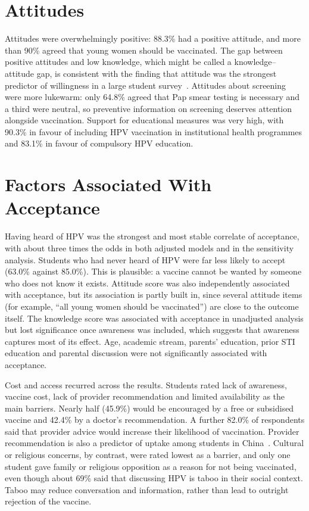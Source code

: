 \section{Attitudes}
Attitudes were overwhelmingly positive: 88.3\% had a positive attitude, and more than 90\% agreed that young women should be vaccinated. The gap between positive attitudes and low knowledge, which might be called a knowledge--attitude gap, is consistent with the finding that attitude was the strongest predictor of willingness in a large student survey~\cite{emon2025}. Attitudes about screening were more lukewarm: only 64.8\% agreed that Pap smear testing is necessary and a third were neutral, so preventive information on screening deserves attention alongside vaccination. Support for educational measures was very high, with 90.3\% in favour of including HPV vaccination in institutional health programmes and 83.1\% in favour of compulsory HPV education.

\section{Factors Associated With Acceptance}
Having heard of HPV was the strongest and most stable correlate of acceptance, with about three times the odds in both adjusted models and in the sensitivity analysis. Students who had never heard of HPV were far less likely to accept (63.0\% against 85.0\%). This is plausible: a vaccine cannot be wanted by someone who does not know it exists. Attitude score was also independently associated with acceptance, but its association is partly built in, since several attitude items (for example, ``all young women should be vaccinated'') are close to the outcome itself. The knowledge score was associated with acceptance in unadjusted analysis but lost significance once awareness was included, which suggests that awareness captures most of its effect. Age, academic stream, parents' education, prior STI education and parental discussion were not significantly associated with acceptance.

Cost and access recurred across the results.
Students rated lack of awareness, vaccine cost, lack of provider recommendation and limited availability as the main barriers.
Nearly half (45.9\%) would be encouraged by a free or subsidised vaccine and 42.4\% by a doctor's recommendation.
A further 82.0\% of respondents said that provider advice would increase their likelihood of vaccination. Provider recommendation is also a predictor of uptake among students in China~\cite{liu2020}. Cultural or religious concerns, by contrast, were rated lowest as a barrier, and only one student gave family or religious opposition as a reason for not being vaccinated, even though about 69\% said that discussing HPV is taboo in their social context. Taboo may reduce conversation and information, rather than lead to outright rejection of the vaccine.

